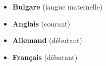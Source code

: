 
\begin{itemize}[leftmargin=1.2em, itemsep=2pt]
	\item \textbf{Bulgare} (langue maternelle)
	\item \textbf{Anglais} (courant)
	\item \textbf{Allemand} (débutant)
	\item \textbf{Français} (débutant)
\end{itemize}
